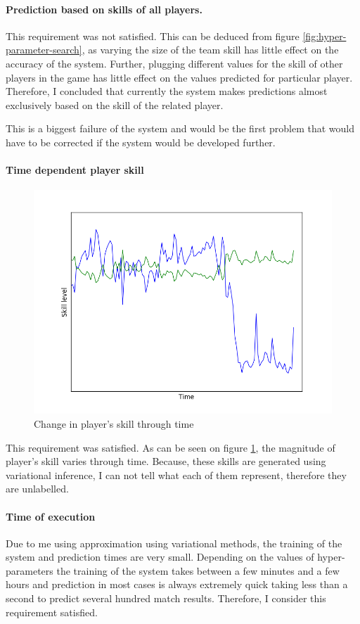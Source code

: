 \documentclass[12pt,a4paper]{book}
\begin{document}
\paragraph{Prediction based on skills of all players.}
This requirement was not satisfied.
This can be deduced from figure \ref{fig:hyper-parameter-search}, as varying the size of the team skill has little effect on the accuracy of the system.
Further, plugging different values for the skill of other players in the game has little effect on the values predicted for particular player.
Therefore, I concluded that currently the system makes predictions almost exclusively based on the skill of the related player.

This is a biggest failure of the system and would be the first problem that would have to be corrected if the system would be developed further.

\paragraph{Time dependent player skill}
\begin{figure}[ht]
\centering
\includegraphics[scale=0.5]{player_skill}
\caption{Change in player's skill through time}
\label{fig:player-skill}
\end{figure}
This requirement was satisfied.
As can be seen on figure \ref{fig:player-skill}, the magnitude of player's skill varies through time.
Because, these skills are generated using variational inference, I can not tell what each of them represent, therefore they are unlabelled.

\paragraph{Time of execution}
Due to me using approximation using variational methods, the training of the system and prediction times are very small.
Depending on the values of hyper-parameters the training of the system takes between a few minutes and a few hours and prediction in most cases is always extremely quick taking less than a second to predict several hundred match results.
Therefore, I consider this requirement satisfied.
\end{document}
